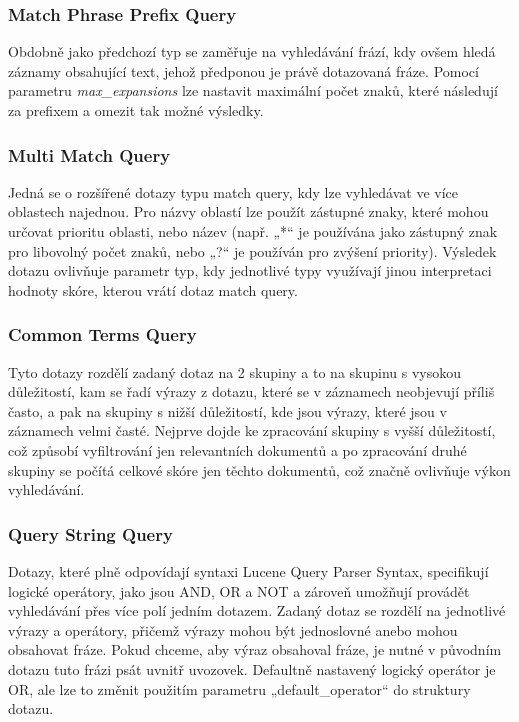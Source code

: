\documentclass[czech,BP]{thesiskiv}
\begin{document}
\subsubsection{Match Phrase Prefix Query}
Obdobně jako předchozí typ se zaměřuje na vyhledávání frází, kdy ovšem hledá záznamy obsahující text, jehož předponou je právě dotazovaná fráze. Pomocí parametru \textit{max\_expansions} lze nastavit maximální počet znaků, které následují za prefixem a omezit tak možné výsledky.

\subsubsection{Multi Match Query}
Jedná se o rozšířené dotazy typu match query, kdy lze vyhledávat ve více oblastech najednou. Pro názvy oblastí lze použít zástupné znaky, které mohou určovat prioritu oblasti, nebo název (např. „*“ je používána jako zástupný znak pro libovolný počet znaků, nebo „?“ je používán pro zvýšení priority). Výsledek dotazu ovlivňuje parametr typ, kdy jednotlivé typy využívají jinou interpretaci hodnoty skóre, kterou vrátí dotaz match query.

\subsubsection{Common Terms Query}
Tyto dotazy rozdělí zadaný dotaz na 2 skupiny a to na skupinu s vysokou důležitostí, kam se řadí výrazy z dotazu, které se v záznamech neobjevují příliš často, a pak na skupiny s nižší důležitostí, kde jsou výrazy, které jsou v záznamech velmi časté. Nejprve dojde ke zpracování skupiny s vyšší důležitostí, což způsobí vyfiltrování jen relevantních dokumentů a po zpracování druhé skupiny se počítá celkové skóre jen těchto dokumentů, což značně ovlivňuje výkon vyhledávání.

\subsubsection{Query String Query}
Dotazy, které plně odpovídají syntaxi Lucene Query Parser Syntax, specifikují logické operátory, jako jsou AND, OR a NOT a zároveň umožňují provádět vyhledávání přes více polí jedním dotazem. Zadaný dotaz se rozdělí na jednotlivé výrazy a operátory, přičemž výrazy mohou být jednoslovné anebo mohou obsahovat fráze. Pokud chceme, aby výraz obsahoval fráze, je nutné v původním dotazu tuto frázi psát uvnitř uvozovek. Defaultně nastavený logický operátor je OR, ale lze to změnit použitím parametru „default\_operator“ do struktury dotazu.
\end{document}
